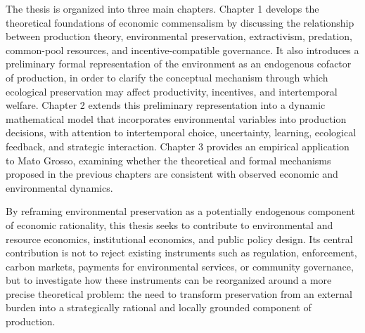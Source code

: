 The thesis is organized into three main chapters. Chapter 1 develops the theoretical foundations of economic commensalism by discussing the relationship between production theory, environmental preservation, extractivism, predation, common-pool resources, and incentive-compatible governance. It also introduces a preliminary formal representation of the environment as an endogenous cofactor of production, in order to clarify the conceptual mechanism through which ecological preservation may affect productivity, incentives, and intertemporal welfare. Chapter 2 extends this preliminary representation into a dynamic mathematical model that incorporates environmental variables into production decisions, with attention to intertemporal choice, uncertainty, learning, ecological feedback, and strategic interaction. Chapter 3 provides an empirical application to Mato Grosso, examining whether the theoretical and formal mechanisms proposed in the previous chapters are consistent with observed economic and environmental dynamics.

By reframing environmental preservation as a potentially endogenous component of economic rationality, this thesis seeks to contribute to environmental and resource economics, institutional economics, and public policy design. Its central contribution is not to reject existing instruments such as regulation, enforcement, carbon markets, payments for environmental services, or community governance, but to investigate how these instruments can be reorganized around a more precise theoretical problem: the need to transform preservation from an external burden into a strategically rational and locally grounded component of production.

\newpage

